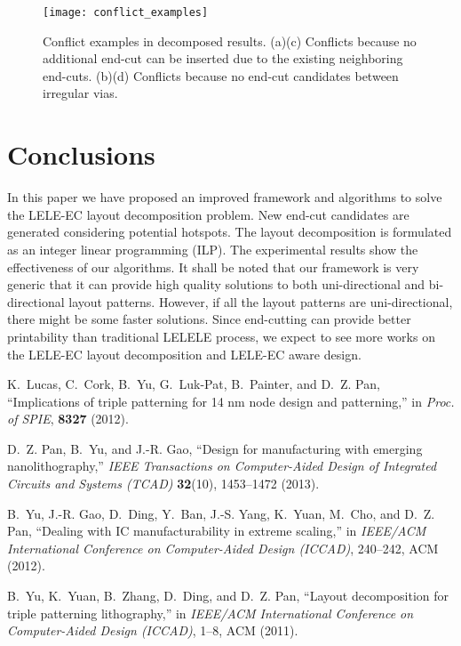 \documentclass[12pt]{spieman}
\theoremstyle{plain}
\begin{document}
\begin{spacing}{1}
\begin{figure}[htb]
  \centering
  \texttt{[image: conflict\_examples]}
  \caption{Conflict examples in decomposed results.
  (a)(c) Conflicts because no additional end-cut can be inserted due to the existing neighboring end-cuts.
  (b)(d) Conflicts because no end-cut candidates between irregular vias.
  }
  \label{fig:tplec_conflicts}
\end{figure}



\section{Conclusions}
\label{sec:tplec_conclu}

In this paper we have proposed an improved framework and algorithms to solve the LELE-EC layout decomposition problem.
New end-cut candidates are generated considering potential hotspots.
The layout decomposition is formulated as an integer linear programming (ILP).
The experimental results show the effectiveness of our algorithms.
It shall be noted that our framework is very generic that it can provide high quality solutions to both uni-directional and bi-directional layout patterns.
However, if all the layout patterns are uni-directional, there might be some faster solutions.
Since end-cutting can provide better printability than traditional LELELE process,
we expect to see more works on the LELE-EC layout decomposition and LELE-EC aware design.


\begin{thebibliography}{10}
K.~Lucas, C.~Cork, B.~Yu, G.~Luk-Pat, B.~Painter, and D.~Z. Pan, ``Implications
  of triple patterning for 14 nm node design and patterning,'' in {\em Proc. of
  SPIE},   {\bf 8327}  (2012).

D.~Z. Pan, B.~Yu, and J.-R. Gao, ``Design for manufacturing with emerging
  nanolithography,'' {\em IEEE Transactions on Computer-Aided Design of
  Integrated Circuits and Systems (TCAD)} {\bf 32}(10), 1453--1472  (2013).

B.~Yu, J.-R. Gao, D.~Ding, Y.~Ban, J.-S. Yang, K.~Yuan, M.~Cho, and D.~Z. Pan,
  ``Dealing with {IC} manufacturability in extreme scaling,'' in {\em IEEE/ACM
  International Conference on Computer-Aided Design (ICCAD)},  240--242, ACM
  (2012).

B.~Yu, K.~Yuan, B.~Zhang, D.~Ding, and D.~Z. Pan, ``Layout decomposition for
  triple patterning lithography,'' in {\em IEEE/ACM International Conference on
  Computer-Aided Design (ICCAD)},  1--8, ACM  (2011).


\end{thebibliography}
\end{spacing}
\end{document}
